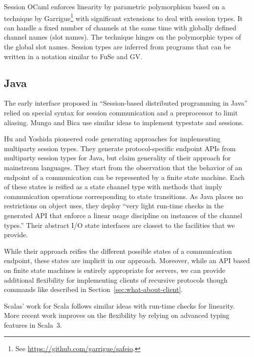 \documentclass[acmsmall,review,anonymous,screen]{acmart}
\begin{document}
Session OCaml \cite{DBLP:journals/scp/ImaiYY19} enforces linearity by
parametric polymorphism based on a technique by
Garrigue\footnote{See \url{https://github.com/garrigue/safeio}.} with significant
extensions to deal with session types.
It can handle a fixed number of channels at the same time with
globally defined channel names (slot names). The technique hinges on
the polymorphic types of the global slot names.
Session types are inferred from programs that can be written in a notation
similar to FuSe and GV.


\subsection{Java}
\label{sec:java}

The early interface proposed in ``Session-based distributed programming in Java''
\cite{DBLP:conf/ecoop/HuYH08} relied on special syntax for session
communication and a preprocessor to limit aliasing.
Mungo \cite{DBLP:journals/scp/KouzapasDPG18} and Bica
\cite{DBLP:journals/corr/abs-1205-5344} use similar ideas to implement
typestate and sessions.

Hu and Yoshida \cite{DBLP:conf/fase/HuY16} pioneered code generating
approaches for implementing multiparty session types. They generate protocol-specific
endpoint APIs from multiparty session  
types for Java, but claim generality of their approach for mainstream
languages. They start from the observation that the behavior of an
endpoint of a communication can be represented by a finite state
machine. Each of these states is reified as a state channel type with
methods that imply communication operations corresponding to state
transitions. As Java places no restrictions on object uses, they
deploy ``very light run-time checks in the 
generated API that enforce a linear usage discipline on instances of
the channel types.'' Their abstract I/O state interfaces are closest
to the facilities that we provide.

While their approach reifies the different possible states of a
communication endpoint, these states are implicit in our
approach. Moreover, while an API based on finite state machines is
entirely appropriate for servers, we can provide additional
flexibility for implementing clients of recursive protocols though
commands like {\AUNROLL} described in
Section~\ref{sec:what-about-client}.

Scalas' work for Scala \cite{DBLP:conf/ecoop/ScalasY16} follows similar
ideas with run-time checks for linearity. More recent work
\cite{DBLP:conf/ecoop/CledouEJP22} improves on the flexibility by
relying on advanced typing features in Scala~3.
\end{document}
